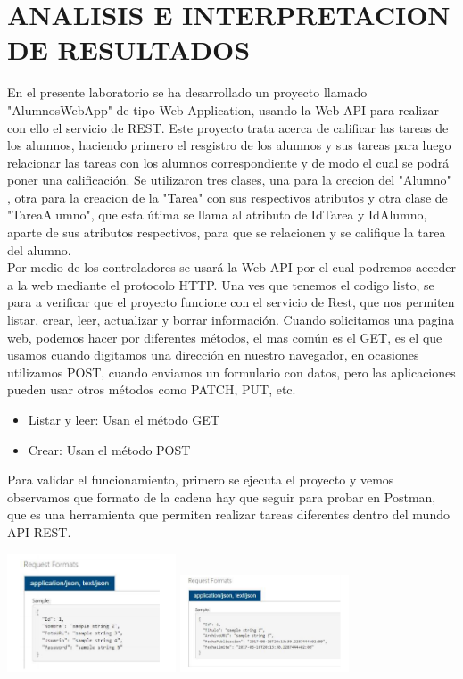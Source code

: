 \section{ANALISIS E INTERPRETACION DE RESULTADOS} 
En el presente laboratorio se ha desarrollado un proyecto llamado "AlumnosWebApp" de tipo Web Application, usando la Web API para realizar con ello el servicio de REST.
Este proyecto trata acerca de calificar las tareas de los alumnos, haciendo primero el resgistro de los alumnos y sus tareas para luego relacionar las tareas con los alumnos correspondiente y de modo el cual se podrá poner una calificación.
Se utilizaron tres clases, una para la crecion del "Alumno" , otra para la creacion de la "Tarea" con sus respectivos atributos y otra clase de "TareaAlumno", que esta útima se llama al atributo de IdTarea y IdAlumno, aparte de sus atributos respectivos, para que se relacionen y se califique la tarea del alumno.
\\
Por medio de los controladores se usará la Web API por el cual podremos acceder a la web mediante el protocolo HTTP.
Una ves que tenemos el codigo listo, se para a verificar que el proyecto funcione con el servicio de Rest, que nos permiten listar, crear, leer, actualizar y borrar información.
Cuando solicitamos una pagina web, podemos hacer por diferentes métodos, el mas común es el GET, es el que usamos cuando digitamos una dirección en nuestro navegador, en ocasiones utilizamos POST, cuando enviamos un formulario con datos, pero las aplicaciones pueden usar otros métodos como PATCH, PUT, etc.
\begin{itemize}
\item Listar y leer: Usan el método GET
\item Crear: Usan el método POST
\end{itemize}
Para validar el funcionamiento, primero se ejecuta el proyecto y vemos observamos que formato de la cadena hay que seguir para probar en Postman, que es una herramienta que permiten realizar tareas diferentes dentro del mundo API REST. 
\begin{center}
\includegraphics[width=5cm]{./Imagenes/analisis1}
\includegraphics[width=5cm]{./Imagenes/analisis2}
\end{center}
